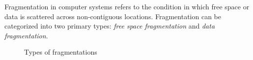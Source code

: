 \begin{comment}
Secondly, SSDs enhance read performance through prefetching, which loads subsequent data in advance based on LBA.
Fragmentation can cause this prefetching to load unnecessary data.\cite{Defragmentation_Log_write_is_ssd_to_bad} For these reasons, filesystem fragmentation is also a concern in SSDs.

\noindent {\textbf{Logical fragmentation and physical fragmentation.}}
I/O performance in flash storage is affected in different ways by logical fragmentation and physical fragmentation.\cite{janusd:atc17}
Logical fragmentation occurs when files are allocated in multiple fragmented storage spaces (extents) within the filesystem.
When a file is not stored contiguously and is spread across various locations, the filesystem recognizes this as being in a logically fragmented state.
As a result, more I/O requests are needed to read the file, which increases overhead in I/O scheduling and handshaking processes.

On the other hand, physical fragmentation happens when the data of a file is allocated non-contiguously at the physical locations of the storage device.
In flash storage, data can be distributed across multiple channels, which directly impacts I/O parallelism.
This can lead to a degradation in I/O performance.
Even if the Physical Block Address (PBA) is contiguous, if the Logical Block Address (LBA) is non-contiguous, separate I/O requests become necessary.
This increases the number of I/O requests, which can lower the overall performance of the system.
Therefore, logical fragmentation and physical fragmentation can occur independently, and appropriate measures are needed to address each issue.
\end{comment}

Fragmentation in computer systems refers to the condition in which free space or data is scattered across non-contiguous locations.
Fragmentation can be categorized into two primary types: \emph{free space fragmentation} and \emph{data fragmentation}.


\begin{figure*}[t]
\centering
	\hspace{0.5em}
	\caption{Types of fragmentations\label{f:fragmentation}}
\end{figure*}

